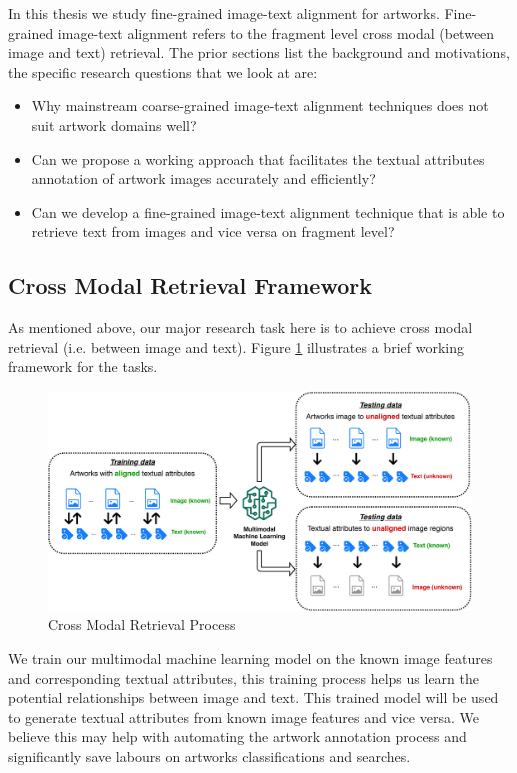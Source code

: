 In this thesis we study fine-grained image-text alignment for artworks. Fine-grained image-text alignment refers to the fragment level cross modal (between image and text) retrieval. The prior sections list the background and motivations, the specific research questions that we look at are:

\begin{itemize}
    \item Why mainstream coarse-grained image-text alignment techniques does not suit artwork domains well?
    \item Can we propose a working approach that facilitates the textual attributes annotation of artwork images accurately and efficiently?
    \item Can we develop a fine-grained image-text alignment technique that is able to retrieve text from images and vice versa on fragment level?
\end{itemize}

\subsection{Cross Modal Retrieval Framework}

As mentioned above, our major research task here is to achieve cross modal retrieval (i.e. between image and text). Figure \ref{fig:framework} illustrates a brief working framework for the tasks.

\begin{figure}[h!]
\centering
\includegraphics[width=\textwidth]{framework.pdf}
\caption{Cross Modal Retrieval Process}
\label{fig:framework}
\end{figure}

We train our multimodal machine learning model on the known image features and corresponding textual attributes, this training process helps us learn the potential relationships between image and text. This trained model will be used to generate textual attributes from known image features and vice versa. We believe this may help with automating the artwork annotation process and significantly save labours on artworks classifications and searches.


